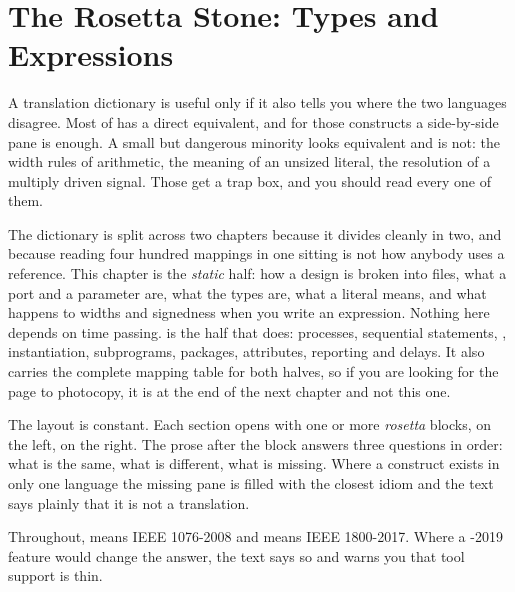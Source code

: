 \chapter{The Rosetta Stone: Types and Expressions}
\label{ch:rosetta}


A translation dictionary is useful only if it also tells you where the two
languages disagree. Most of \VHDL{} has a direct \SV{} equivalent, and for
those constructs a side-by-side pane is enough. A small but dangerous
minority looks equivalent and is not: the width rules of arithmetic, the
meaning of an unsized literal, the resolution of a multiply driven signal.
Those get a trap box, and you should read every one of them.

The dictionary is split across two chapters because it divides cleanly in two,
and because reading four hundred mappings in one sitting is not how anybody
uses a reference. This chapter is the \emph{static} half: how a design is
broken into files, what a port and a parameter are, what the types are, what a
literal means, and what happens to widths and signedness when you write an
expression. Nothing here depends on time passing.  is the
half that does: processes, sequential statements, ,
instantiation, subprograms, packages, attributes, reporting and delays. It
also carries the complete mapping table for both halves, so if you are looking
for the page to photocopy, it is at the end of the next chapter and not this
one.

The layout is constant. Each section opens with one or more \emph{rosetta}
blocks, \VHDL{} on the left, \SV{} on the right. The prose after the block
answers three questions in order: what is the same, what is different, what is
missing. Where a construct exists in only one language the missing pane is
filled with the closest idiom and the text says plainly that it is not a
translation.

Throughout, \VHDL{} means IEEE 1076-2008 and \SV{} means IEEE 1800-2017. Where
a \VHDL{}-2019 feature would change the answer, the text says so and warns you
that tool support is thin.


